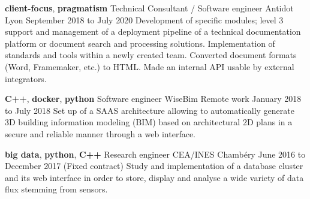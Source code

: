 \documentclass[11pt,a4paper]{moderncv}
\begin{document}
  \cventry
    {\textbf{client-focus}, \textbf{pragmatism}}
    {Technical Consultant / Software engineer}
    {Antidot}
    {Lyon}
    {September 2018 to July 2020}{
        Development of specific modules; level 3 support and management of a deployment pipeline
        of a technical documentation platform or document search and processing solutions. Implementation
        of standards and tools within a newly created team. Converted document
        formats (Word, Framemaker, etc.) to HTML. Made an internal API usable by external integrators.
    }

  \cventry
    {\textbf{C++}, \textbf{docker}, \textbf{python}}
    {Software engineer}
    {WiseBim}
    {Remote work}
    {January 2018 to July 2018}{
      Set up of a SAAS architecture allowing to automatically generate 3D
	  building information modeling (BIM) based on architectural 2D plans in
	  a secure and reliable manner through a web interface.
    }

  \cventry
    {\textbf{big data}, \textbf{python}, \textbf{C++}}
    {Research engineer}
    {CEA/INES}
    {Chambéry}
    {June 2016 to December 2017 (Fixed contract)}{
      Study and implementation of a database cluster and its web interface in
      order to store, display and analyse a wide variety of data flux stemming
      from sensors.
    }




\end{document}
